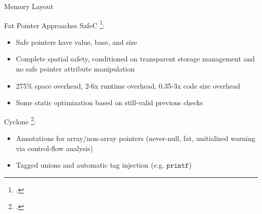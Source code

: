 \documentclass[aspectratio=169]{beamer}
\begin{document}
\begin{frame}{Memory Layout}
\end{frame}

\begin{frame}{Fat Pointer Approaches}
SafeC \footcite{austin_efficient_1994}:
\begin{itemize}
  \item \alert{Safe} pointers have value, base, and size
  \item Complete spatial safety, conditioned on \alert{transparent} storage management and no safe pointer attribute \alert{manipulation} 
  \item 275\% space overhead, 2-6x runtime overhead, 0.35-3x code size overhead 
  \item Some static optimization based on still-valid previous checks
\end{itemize}
\vspace{0.1in}


Cyclone \footcite{jim_cyclone:_2002}: 
\begin{itemize}
    \item Annotations for array/non-array pointers (never-null, fat, unitialized warning via control-flow analysis) %
    \item Tagged unions and automatic tag injection (e.g. $\texttt{printf}$)
\end{itemize}
\end{frame}
\end{document}
